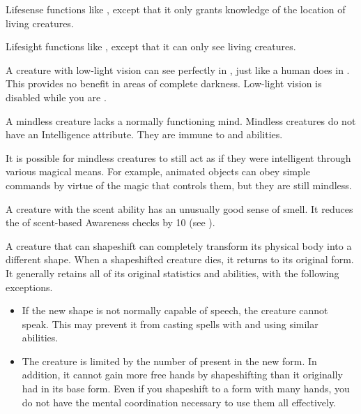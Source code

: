         Lifesense functions like , except that it only grants knowledge of the location of living creatures.

        Lifesight functions like , except that it can only see living creatures.

        A creature with low-light vision can see perfectly in , just like a human does in .
        This provides no benefit in areas of complete darkness.
        Low-light vision is disabled while you are \dazzled.

        A mindless creature lacks a normally functioning mind.
        Mindless creatures do not have an Intelligence attribute.
        They are immune to  and  abilities.

        It is possible for mindless creatures to still act as if they were intelligent through various magical means.
        For example, animated objects can obey simple commands by virtue of the magic that controls them, but they are still mindless.

        A creature with the scent ability has an unusually good sense of smell.
        It reduces the  of scent-based Awareness checks by 10 (see ).

        A creature that can shapeshift can completely transform its physical body into a different shape.
        When a shapeshifted creature dies, it returns to its original form.
        It generally retains all of its original statistics and abilities, with the following exceptions.
        \begin{itemize}
            \item If the new shape is not normally capable of speech, the creature cannot speak.
                This may prevent it from casting spells with  and using similar abilities.
            \item The creature is limited by the number of  present in the new form.
                In addition, it cannot gain more free hands by shapeshifting than it originally had in its base form.
                Even if you shapeshift to a form with many hands, you do not have the mental coordination necessary to use them all effectively.
        \end{itemize}


